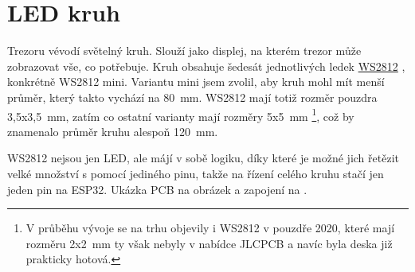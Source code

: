 \section{LED kruh}
\label{WS2812}

Trezoru vévodí světelný kruh. Slouží jako displej, na kterém trezor může zobrazovat vše, co potřebuje. Kruh obsahuje šedesát jednotlivých ledek 
\href{https://cdn-shop.adafruit.com/datasheets/WS2812B.pdf}{WS2812} \parencite{WS2812}, konkrétně WS2812 mini. Variantu mini jsem zvolil, aby kruh mohl mít menší
průměr, který takto vychází na 80~mm. WS2812 mají totiž rozměr pouzdra 3,5x3,5~mm, zatím co ostatní varianty mají rozměry 5x5~mm \footnote{V průběhu vývoje se na trhu 
objevily i WS2812 v pouzdře 2020, které mají rozměru 2x2~mm ty však nebyly v nabídce JLCPCB a navíc byla deska již prakticky hotová.}, což by znamenalo průměr kruhu alespoň 120~mm.

WS2812 nejsou jen LED, ale májí v sobě logiku, díky které je možné jich řetězit velké množství s pomocí jediného pinu, takže na řízení celého kruhu stačí jen jeden pin na ESP32.\newline
Ukázka PCB na obrázek  a zapojení na .
